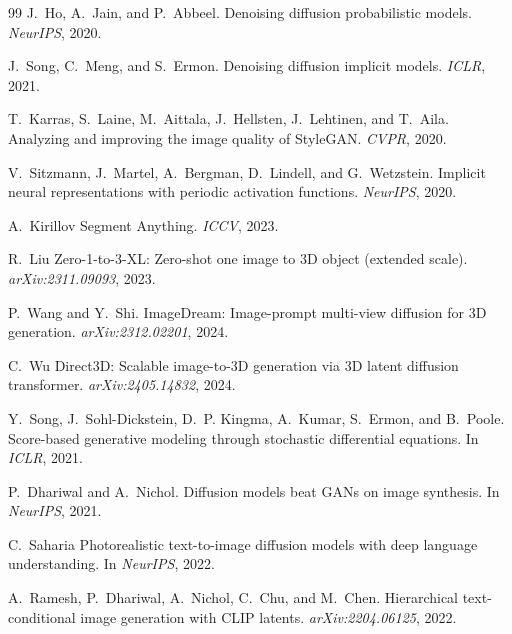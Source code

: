 \begin{thebibliography}{99}
J.~Ho, A.~Jain, and P.~Abbeel.
Denoising diffusion probabilistic models.
\emph{NeurIPS}, 2020.


J.~Song, C.~Meng, and S.~Ermon.
Denoising diffusion implicit models.
\emph{ICLR}, 2021.


T.~Karras, S.~Laine, M.~Aittala, J.~Hellsten, J.~Lehtinen, and T.~Aila.
Analyzing and improving the image quality of StyleGAN.
\emph{CVPR}, 2020.


V.~Sitzmann, J.~Martel, A.~Bergman, D.~Lindell, and G.~Wetzstein.
Implicit neural representations with periodic activation functions.
\emph{NeurIPS}, 2020.


A.~Kirillov \etal
Segment Anything.
\emph{ICCV}, 2023.


R.~Liu \etal
Zero-1-to-3-XL: Zero-shot one image to 3D object (extended scale).
\emph{arXiv:2311.09093}, 2023.


P.~Wang and Y.~Shi.
ImageDream: Image-prompt multi-view diffusion for 3D generation.
\emph{arXiv:2312.02201}, 2024.


C.~Wu \etal
Direct3D: Scalable image-to-3D generation via 3D latent diffusion transformer.
\emph{arXiv:2405.14832}, 2024.



Y.~Song, J.~Sohl-Dickstein, D.~P. Kingma, A.~Kumar, S.~Ermon, and B.~Poole.
Score-based generative modeling through stochastic differential equations.
In \emph{ICLR}, 2021.


P.~Dhariwal and A.~Nichol.
Diffusion models beat {GANs} on image synthesis.
In \emph{NeurIPS}, 2021.


C.~Saharia \etal
Photorealistic text-to-image diffusion models with deep language understanding.
In \emph{NeurIPS}, 2022.


A.~Ramesh, P.~Dhariwal, A.~Nichol, C.~Chu, and M.~Chen.
Hierarchical text-conditional image generation with {CLIP} latents.
\emph{arXiv:2204.06125}, 2022.



\end{thebibliography}
